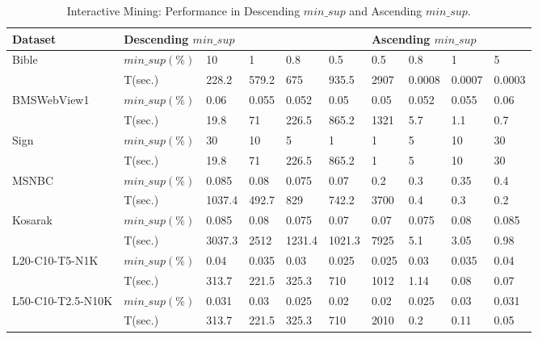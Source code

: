 \begin{table*}[!htbp]
\centering
\begin{tabular}{|l|l|l|l|l|l|l|l|l|l|}
\hline
 Dataset & \multicolumn{5}{l|}{Descending $min\_sup$}  & \multicolumn{4}{l|}{Ascending $min\_sup$} \\ 
 \hline
 Bible & $min\_sup(\%)$ & 10 & 1 & 0.8 & 0.5 & 0.5 & 0.8 & 1 & 5\\
 & T(sec.) & 228.2 & 579.2 & 675 & 935.5 &  2907 & 0.0008 & 0.0007 & 0.0003\\
 \hline
 BMSWebView1 & $min\_sup(\%)$ & 0.06 & 0.055 & 0.052 & 0.05 & 0.05 & 0.052 & 0.055 & 0.06 \\  
 & T(sec.) & 19.8 & 71 & 226.5 & 865.2 & 1321 & 5.7 & 1.1 & 0.7  \\
 \hline
 Sign & $min\_sup(\%)$ & 30 & 10 & 5 & 1 & 1  & 5 & 10 & 30 \\  
 & T(sec.) & 19.8 & 71 & 226.5 & 865.2 & 1 & 5 & 10 & 30 \\ 
 \hline
 MSNBC & $min\_sup(\%)$ &  0.085 & 0.08 & 0.075 & 0.07 & 0.2 & 0.3 & 0.35 & 0.4 \\
 & T(sec.) & 1037.4 & 492.7 & 829 & 742.2 & 3700 & 0.4 & 0.3 & 0.2 \\ 
 \hline
 Kosarak & $min\_sup(\%)$ &0.085 & 0.08 & 0.075 & 0.07 & 0.07 & 0.075 & 0.08 & 0.085\\
 & T(sec.) & 3037.3 & 2512 & 1231.4 & 1021.3 & 7925 & 5.1 & 3.05 &0.98 \\
 \hline
 L20-C10-T5-N1K & $min\_sup(\%)$ & 0.04 & 0.035 & 0.03 & 0.025  & 0.025 & 0.03 & 0.035 & 0.04 \\
 & T(sec.) & 313.7 & 221.5 & 325.3 & 710 & 1012 & 1.14 & 0.08 & 0.07 \\
 \hline
 L50-C10-T2.5-N10K & $min\_sup(\%)$ & 0.031 & 0.03 & 0.025 & 0.02 & 0.02 & 0.025 & 0.03 & 0.031 \\
 & T(sec.) & 313.7 & 221.5 & 325.3 & 710 & 2010 & 0.2 & 0.11 & 0.05 \\
 \hline
\end{tabular}
\caption{Interactive Mining: Performance in Descending $min\_sup$ and Ascending $min\_sup$.}
\label{table:interactive_mining_descending_minsup}
\end{table*}

